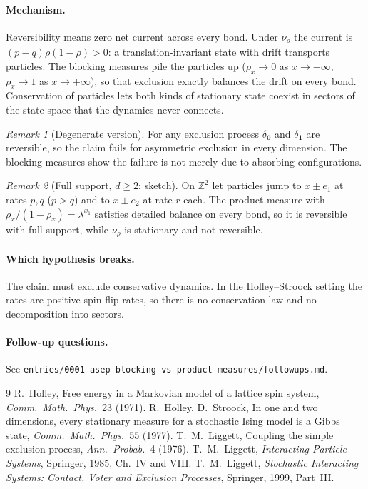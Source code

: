 \documentclass[11pt]{article}
\theoremstyle{remark}\newtheorem*{remark}{Remark}
\newcommand{\Z}{\mathbb{Z}}
\begin{document}
\paragraph{Mechanism.} Reversibility means zero net current across every bond. Under $\nu_\rho$ the current is $(p-q)\rho(1-\rho)>0$: a translation-invariant state with drift transports particles. The blocking measures pile the particles up ($\rho_x\to0$ as $x\to-\infty$, $\rho_x\to1$ as $x\to+\infty$), so that exclusion exactly balances the drift on every bond. Conservation of particles lets both kinds of stationary state coexist in sectors of the state space that the dynamics never connects.

\begin{remark}[Degenerate version]
For any exclusion process $\delta_{\mathbf 0}$ and $\delta_{\mathbf 1}$ are reversible, so the claim fails for asymmetric exclusion in every dimension. The blocking measures show the failure is not merely due to absorbing configurations.
\end{remark}

\begin{remark}[Full support, $d\ge2$; sketch]
On $\Z^2$ let particles jump to $x\pm e_1$ at rates $p,q$ ($p>q$) and to $x\pm e_2$ at rate $r$ each. The product measure with $\rho_x/(1-\rho_x)=\lambda^{x_1}$ satisfies detailed balance on every bond, so it is reversible with full support, while $\nu_\rho$ is stationary and not reversible.
\end{remark}

\paragraph{Which hypothesis breaks.} The claim must exclude conservative dynamics. In the Holley--Stroock setting the rates are positive spin-flip rates, so there is no conservation law and no decomposition into sectors.

\paragraph{Follow-up questions.} See \texttt{entries/0001-asep-blocking-vs-product-measures/followups.md}.

\begin{thebibliography}{9}\small
{} R.~Holley, Free energy in a Markovian model of a lattice spin system, \emph{Comm.\ Math.\ Phys.}\ 23 (1971).
 R.~Holley, D.~Stroock, In one and two dimensions, every stationary measure for a stochastic Ising model is a Gibbs state, \emph{Comm.\ Math.\ Phys.}\ 55 (1977).
 T.~M.~Liggett, Coupling the simple exclusion process, \emph{Ann.\ Probab.}\ 4 (1976).
 T.~M.~Liggett, \emph{Interacting Particle Systems}, Springer, 1985, Ch.~IV and VIII.
 T.~M.~Liggett, \emph{Stochastic Interacting Systems: Contact, Voter and Exclusion Processes}, Springer, 1999, Part~III.
\end{thebibliography}
\end{document}

